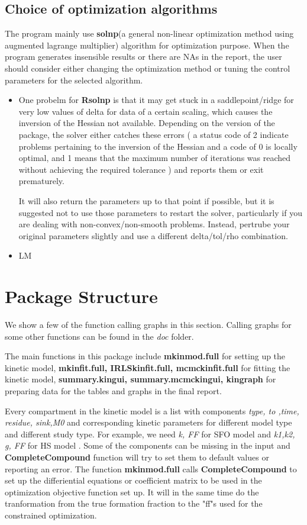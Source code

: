 \documentclass{article}
\begin{document}
\subsection{Choice of optimization algorithms}
The program mainly use \textbf{solnp}(a general non-linear optimization method using augmented lagrange multiplier) algorithm for optimization purpose. When the program generates insensible results or there are NAs in the report, the user should consider either changing the optimization method or tuning the control parameters for the selected algorithm.

\begin{itemize}
\item One probelm for \textbf{Rsolnp} is that it may get stuck in a saddlepoint/ridge for very low
values of delta for data of a certain scaling, which causes the inversion of the Hessian not available. Depending on the version of the package, the solver either catches these errors ( a status code of 2 indicate problems pertaining to the inversion of the Hessian and a code of 0 is locally optimal,
and 1 means that the maximum number of iterations was reached without
achieving the required tolerance ) and reports them or exit prematurely.

It will also return the parameters up to that point if possible, but it is suggested  not to use those parameters to restart the solver,
particularly if you are dealing with non-convex/non-smooth problems.
Instead, pertrube your original parameters slightly and use a different
delta/tol/rho combination.
\item LM
\end{itemize}
\appendix
\section{Package Structure}
We show a few of the function calling graphs in this section. Calling graphs for some other functions can be found in the \textsl{doc} folder.

The main functions in this package include \textbf{mkinmod.full} for setting up the kinetic model,  \textbf{mkinfit.full, IRLSkinfit.full, mcmckinfit.full} for fitting the kinetic model, \textbf{summary.kingui, summary.mcmckingui, kingraph} for preparing data for the tables and graphs in the final report.

Every compartment in the kinetic model is a list with components \textsl{type, to ,time, residue, sink,M0} and corresponding kinetic parameters for different model type and different study type. For example, we need \textsl{k, FF} for SFO model and \textsl{k1,k2, g, FF} for HS model . Some of the components can be missing in the input and \textbf{CompleteCompound} function will try to set them to default values or reporting an error. The  function \textbf{mkinmod.full} calls  \textbf{CompleteCompound} to set up the differiential equations or coefficient matrix to be used in the optimization objective function set up. It will in the same time do the tranformation from the true formation fraction to the "ff"s used for the constrained optimization.
\end{document}

